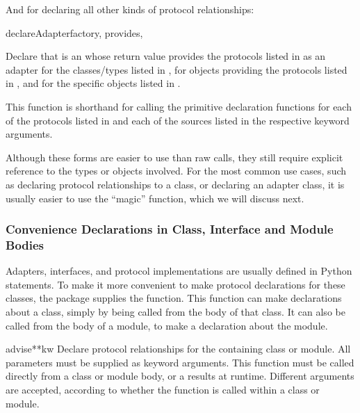 \begin{verbatim%
}
\begin{verbatim%
}
\begin{verbatim%
}
\begin{verbatim%
}
\begin{verbatim%
}
\begin{verbatim%
}
And for declaring all other kinds of protocol relationships:

\begin{funcdesc}{declareAdapter}{factory, provides,
 
}

Declare that  is an  whose return value
provides the protocols listed in  as an adapter for the
classes/types listed in , for objects providing the protocols
listed in , and for the specific objects listed in
.

This function is shorthand for calling the primitive declaration
functions for each of the protocols listed in  and each of the
sources listed in the respective keyword arguments.
\end{funcdesc}

Although these forms are easier to use than raw 
calls, they still require explicit reference to the types or objects involved.
For the most common use cases, such as declaring protocol relationships to a
class, or declaring an adapter class, it is usually easier to use the ``magic''
 function, which we will discuss next.



















\subsubsection{Convenience Declarations in Class, Interface and Module Bodies \label{protcols-advise}}

Adapters, interfaces, and protocol implementations are usually defined in
Python  statements.  To make it more convenient to make protocol
declarations for these classes, the  package supplies the
 function.  This function  can make declarations about a
class, simply by being called from the body of that class.  It can also be
called from the body of a module, to make a declaration about the module.

\begin{funcdesc}{advise}{**kw}
Declare protocol relationships for the containing class or module.  All
parameters must be supplied as keyword arguments.  This function must be
called directly from a class or module body, or a 
results at runtime.  Different arguments are accepted, according to whether
the function is called within a class or module.


\end{funcdesc}
\end{verbatim%
}
\end{verbatim%
}
\end{verbatim%
}
\end{verbatim%
}
\end{verbatim%
}
\end{verbatim%
}

